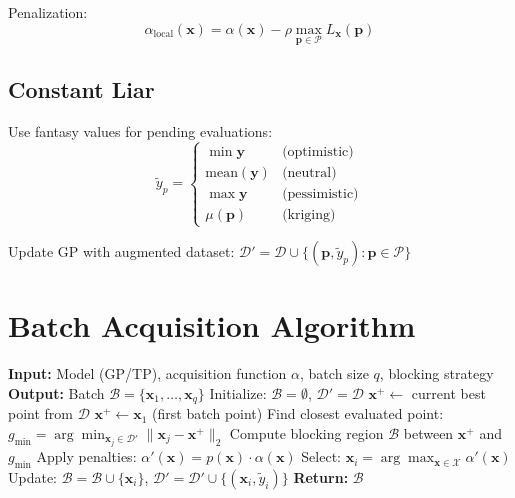 \documentclass[11pt,a4paper]{article}
\begin{document}
Penalization:
\begin{equation}
    \alpha_{\text{local}}(\mathbf{x}) = \alpha(\mathbf{x}) - \rho \max_{\mathbf{p} \in \mathcal{P}} L_{\mathbf{x}}(\mathbf{p})
\end{equation}

\subsection{Constant Liar}

Use fantasy values for pending evaluations:
\begin{equation}
    \tilde{y}_p = 
    \begin{cases}
        \min \mathbf{y} & \text{(optimistic)} \\
        \text{mean}(\mathbf{y}) & \text{(neutral)} \\
        \max \mathbf{y} & \text{(pessimistic)} \\
        \mu(\mathbf{p}) & \text{(kriging)}
    \end{cases}
\end{equation}

Update GP with augmented dataset: $\mathcal{D}' = \mathcal{D} \cup \{(\mathbf{p}, \tilde{y}_p) : \mathbf{p} \in \mathcal{P}\}$

\section{Batch Acquisition Algorithm}

\begin{algorithm}[H]
\caption{Sequential Greedy Batch Acquisition with Targeted Blocking}
\begin{algorithmic}[1]
\State \textbf{Input:} Model (GP/TP), acquisition function $\alpha$, batch size $q$, blocking strategy
\State \textbf{Output:} Batch $\mathcal{B} = \{\mathbf{x}_1, \ldots, \mathbf{x}_q\}$
\State Initialize: $\mathcal{B} = \emptyset$, $\mathcal{D}' = \mathcal{D}$
        \State $\mathbf{x}^+ \gets$ current best point from $\mathcal{D}$
    \Else
        \State $\mathbf{x}^+ \gets \mathbf{x}_1$ (first batch point)
    \EndIf
    \State Find closest evaluated point: $g_{\min} = \arg\min_{\mathbf{x}_j \in \mathcal{D}'} \|\mathbf{x}_j - \mathbf{x}^+\|_2$
    \State Compute blocking region $\mathcal{B}$ between $\mathbf{x}^+$ and $g_{\min}$
    \State Apply penalties: $\alpha'(\mathbf{x}) = p(\mathbf{x}) \cdot \alpha(\mathbf{x})$
    \State Select: $\mathbf{x}_i = \arg\max_{\mathbf{x} \in \mathcal{X}} \alpha'(\mathbf{x})$
    \State Update: $\mathcal{B} = \mathcal{B} \cup \{\mathbf{x}_i\}$, $\mathcal{D}' = \mathcal{D}' \cup \{(\mathbf{x}_i, \tilde{y}_i)\}$
\EndFor
\State \textbf{Return:} $\mathcal{B}$
\end{algorithmic}
\end{algorithm}
\end{document}
